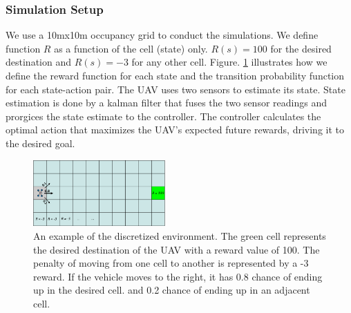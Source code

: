 \documentclass[letterpaper, 10 pt, conference]{ieeeconf}  %
\begin{document}
\subsubsection{Simulation Setup}
We use a 10mx10m occupancy grid to conduct the simulations. We define function $R$ as a function of the cell (state) only. $R(s) = 100$ for the desired destination and $R(s) = -3$ for any other cell. Figure. \ref{fig:sim-env} illustrates how we define the reward function for each state and the transition probability function for each state-action pair. The UAV uses two sensors to estimate its state. State estimation is done by a kalman filter that fuses the two sensor readings and prorgices the state estimate to the controller. The controller calculates the optimal action that maximizes the UAV's expected future rewards, driving it to the desired goal.
\begin{figure}[h]
\centering
\includegraphics[width=0.45\textwidth]{sim-env}
\caption{An example of the discretized environment. The green cell represents the desired destination of the UAV with a reward value of 100. The penalty of moving from one cell to another is represented by a -3 reward. If the vehicle moves to the right, it has 0.8 chance of ending up in the desired cell. and 0.2 chance of ending up in an adjacent cell.}
 \label{fig:sim-env}
\end{figure}
\end{document}
